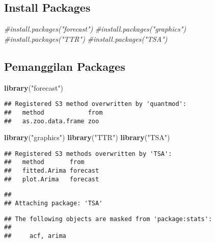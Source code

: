 \documentclass[
]{article}
\author{}
\date{\vspace{-2.5em}}
\newenvironment{Shaded}{\begin{snugshade}}{\end{snugshade}}
\newcommand{\CommentTok}[1]{\textcolor[rgb]{0.56,0.35,0.01}{\textit{#1}}}
\newcommand{\FunctionTok}[1]{\textcolor[rgb]{0.13,0.29,0.53}{\textbf{#1}}}
\newcommand{\NormalTok}[1]{#1}
\newcommand{\StringTok}[1]{\textcolor[rgb]{0.31,0.60,0.02}{#1}}
\begin{document}
\hypertarget{install-packages}{%
\subsection{Install Packages}\label{install-packages}}

\begin{Shaded}
\begin{Highlighting}[]
\CommentTok{\#install.packages("forecast")}
\CommentTok{\#install.packages("graphics")}
\CommentTok{\#install.packages("TTR")}
\CommentTok{\#install.packages("TSA")}
\end{Highlighting}
\end{Shaded}

\hypertarget{pemanggilan-packages}{%
\subsection{Pemanggilan Packages}\label{pemanggilan-packages}}

\begin{Shaded}
\begin{Highlighting}[]
\FunctionTok{library}\NormalTok{(}\StringTok{"forecast"}\NormalTok{)}
\end{Highlighting}
\end{Shaded}

\begin{verbatim}
## Registered S3 method overwritten by 'quantmod':
##   method            from
##   as.zoo.data.frame zoo
\end{verbatim}

\begin{Shaded}
\begin{Highlighting}[]
\FunctionTok{library}\NormalTok{(}\StringTok{"graphics"}\NormalTok{)}
\FunctionTok{library}\NormalTok{(}\StringTok{"TTR"}\NormalTok{)}
\FunctionTok{library}\NormalTok{(}\StringTok{"TSA"}\NormalTok{)}
\end{Highlighting}
\end{Shaded}

\begin{verbatim}
## Registered S3 methods overwritten by 'TSA':
##   method       from    
##   fitted.Arima forecast
##   plot.Arima   forecast
\end{verbatim}

\begin{verbatim}
## 
## Attaching package: 'TSA'
\end{verbatim}

\begin{verbatim}
## The following objects are masked from 'package:stats':
## 
##     acf, arima
\end{verbatim}
\end{document}
